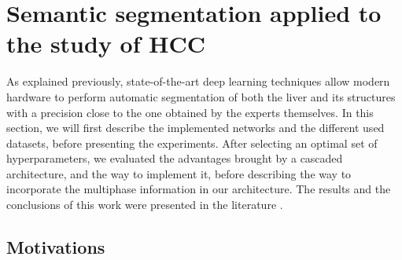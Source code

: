 


\chapter{Semantic segmentation applied to the study of HCC}

As explained previously, state-of-the-art deep learning techniques allow
modern hardware to perform automatic segmentation of both the liver and
its structures with a precision close to the one obtained by the experts
themselves.
In this section, we will first describe the implemented
networks and the different used datasets, before presenting the experiments.
After selecting an optimal set of hyperparameters, we evaluated the
advantages brought by a cascaded architecture, and the way to implement
it, before describing the way to incorporate the multiphase information
in our architecture.
The results and the conclusions of this work were presented in the
literature \cite{Ouhmich2019}.


\section{Motivations}

